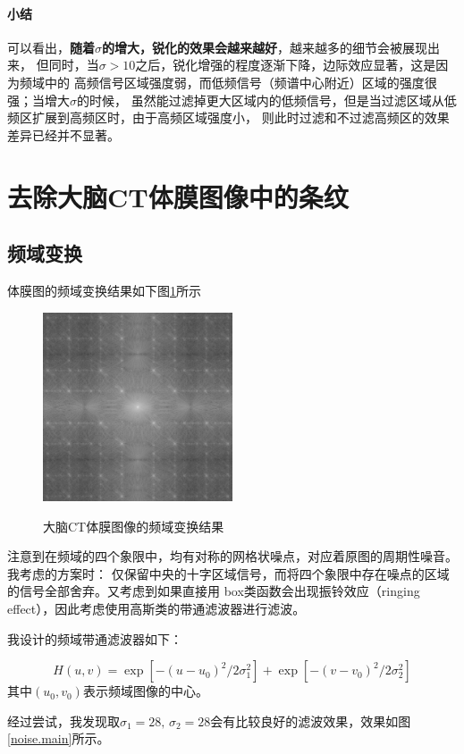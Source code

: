 \documentclass{article}
\begin{document}
\paragraph{小结}
可以看出，\textbf{随着$\sigma$的增大，锐化的效果会越来越好}，越来越多的细节会被展现出来，
但同时，当$\sigma>10$之后，锐化增强的程度逐渐下降，边际效应显著，这是因为频域中的
高频信号区域强度弱，而低频信号（频谱中心附近）区域的强度很强；当增大$\sigma$的时候，
虽然能过滤掉更大区域内的低频信号，但是当过滤区域从低频区扩展到高频区时，由于高频区域强度小，
则此时过滤和不过滤高频区的效果差异已经并不显著。

\section{去除大脑CT体膜图像中的条纹}

\subsection{频域变换}
体膜图的频域变换结果如下图\ref{CT}所示
\begin{figure}[H]
	\centering
	{\includegraphics[width=0.5\textwidth]{remove_noise_result//frequency.png}} 
	\caption{大脑CT体膜图像的频域变换结果} \label{CT}
\end{figure}

注意到在频域的四个象限中，均有对称的网格状噪点，对应着原图的周期性噪音。我考虑的方案时：
仅保留中央的十字区域信号，而将四个象限中存在噪点的区域的信号全部舍弃。又考虑到如果直接用
box类函数会出现振铃效应（ringing effect），因此考虑使用高斯类的带通滤波器进行滤波。

我设计的频域带通滤波器如下：

\[
H(u,v) = \exp[-(u-u_0)^2/2\sigma_1^2] + \exp[-(v-v_0)^2/2\sigma_2^2]	
\]
其中$(u_0,v_0)$表示频域图像的中心。

经过尝试，我发现取$\sigma_1 =28,\, \sigma_2 = 28$会有比较良好的滤波效果，效果如图\ref{noise.main}所示。
\end{document}
